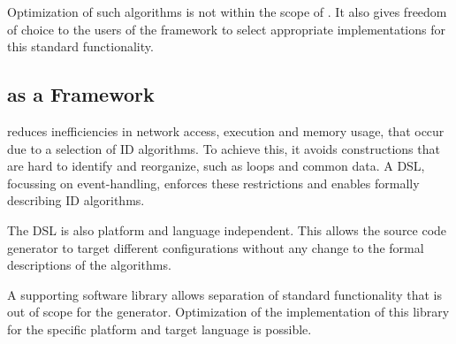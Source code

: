 \documentclass[conference]{IEEEtran}
\begin{document}
Optimization of such algorithms is not within the scope of \NAME. It also gives
freedom of choice to the users of the framework to select appropriate
implementations for this standard functionality.

\subsection{\NAME as a Framework}

\NAME reduces inefficiencies in network access, execution and memory usage,
that occur due to a selection of ID algorithms. To achieve this, it avoids
constructions that are hard to identify and reorganize, such as loops and
common data. A DSL, focussing on event-handling, enforces these restrictions
and enables formally describing ID algorithms.

The DSL is also platform and language independent. This allows the source code
generator to target different configurations without any change to the formal
descriptions of the algorithms.

A supporting software library allows separation of standard functionality that
is out of scope for the generator. Optimization of the implementation of this
library for the specific platform and target language is possible.
\end{document}
